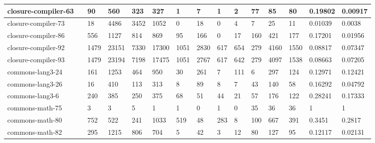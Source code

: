 \begin{landscape}
\begin{table}[]
\begin{tabular}{|l|l|l|l|l|l|l|l|l|l|l|l|l|l|l|}
		closure-compiler-63         &                     & 90    & 560    & 323    & 327    & 1     & 7     & 1   & 2   & 77                      & 85           & 80          & 0.19802         & 0.00917        \\ \hline
		closure-compiler-73         &                     & 18    & 4486   & 3452   & 1052   & 0     & 18    & 0   & 4   & 7                       & 25           & 11          & 0.01039         & 0.0038         \\ \hline
		closure-compiler-86         &                     & 556   & 1127   & 814    & 869    & 95    & 166   & 0   & 17  & 160                     & 421          & 177         & 0.17201         & 0.01956        \\ \hline
		closure-compiler-92         &                     & 1479  & 23151  & 7330   & 17300  & 1051  & 2830  & 617 & 654 & 279                     & 4160         & 1550        & 0.08817         & 0.07347        \\ \hline
		closure-compiler-93         &                     & 1479  & 23194  & 7198   & 17475  & 1051  & 2767  & 617 & 642 & 279                     & 4097         & 1538        & 0.08663         & 0.07205        \\ \hline
		commons-lang3-24            &                     & 161   & 1253   & 464    & 950    & 30    & 261   & 7   & 111 & 6                       & 297          & 124         & 0.12971         & 0.12421        \\ \hline
		commons-lang3-26            &                     & 16    & 410    & 113    & 313    & 8     & 89    & 8   & 7   & 43                      & 140          & 58          & 0.16292         & 0.04792        \\ \hline
		commons-lang3-6             &                     & 240   & 385    & 250    & 375    & 68    & 51    & 44  & 21  & 57                      & 176          & 122         & 0.28241         & 0.17333        \\ \hline
		commons-math-75             &                     & 3     & 3      & 5      & 1      & 1     & 0     & 1   & 0   & 35                      & 36           & 36          & 1               & 1              \\ \hline
		commons-math-80             &                     & 752   & 522    & 241    & 1033   & 519   & 48    & 283 & 8   & 100                     & 667          & 391         & 0.3451          & 0.2817         \\ \hline
		commons-math-82             &                     & 295   & 1215   & 806    & 704    & 5     & 42    & 3   & 12  & 80                      & 127          & 95          & 0.12117         & 0.02131        \\ \hline

\end{tabular}
\end{table}
\end{landscape}
